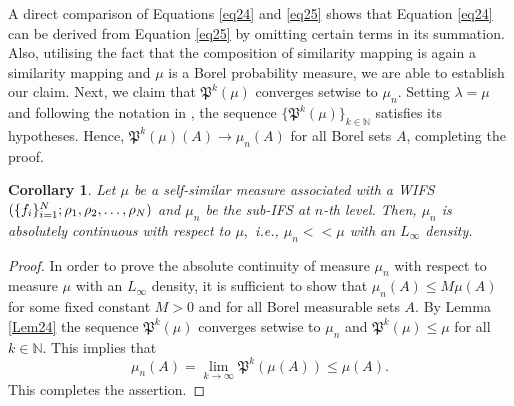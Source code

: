 \documentclass{amsproc}
\newtheorem{corollary}[theorem]{Corollary}
\theoremstyle{definition}
\theoremstyle{remark}
\numberwithin{equation}{section}
\begin{document}
  A direct comparison of Equations \ref{eq24} and \ref{eq25} shows that Equation \ref{eq24} can be derived from Equation \ref{eq25} by omitting certain terms in its summation. Also, utilising the fact that the composition of similarity mapping is again a similarity mapping and $\mu$ is a Borel probability measure, we are able to establish our claim.
  Next, we claim that $\mathfrak{P}^k(\mu)$ converges setwise to $\mu_n$. Setting $\lambda = \mu$ and following the notation in \cite[Theorem 1]{XYZL}, the sequence $\{\mathfrak{P}^k(\mu)\}_{k \in \mathbb{N}}$ satisfies its hypotheses. Hence, $\mathfrak{P}^k(\mu)(A) \to \mu_n(A)$ for all Borel sets $A$, completing the proof.
\begin{corollary}\label{cor24}
    Let $\mu$ be a self-similar measure associated with a WIFS $(\{f_i\}_{i=1}^N\\; \rho_1,\rho_2,\ldots,\rho_N)$ and $\mu_n$ be the sub-IFS at $n$-th level. Then, $\mu_n$ is absolutely continuous with respect to $\mu,$ i.e., $\mu_n << \mu$ with an $L_\infty$ density.
\end{corollary}
\begin{proof}
    In order to prove the absolute continuity of measure $\mu_n$ with respect to measure $\mu$ with an $L_\infty$ density, it is sufficient to show that $\mu_n(A) \le M \mu(A)$ for some fixed constant $M>0$ and for all Borel measurable sets $A$. By Lemma \ref{Lem24} the sequence $\mathfrak{P}^k(\mu)$ converges setwise to $\mu_n$ and $\mathfrak{P}^k(\mu) \le \mu$ for all $k \in \mathbb{N}$. This implies that 
    $$\mu_n(A)= \lim_{k \to \infty} \mathfrak{P}^k(\mu(A)) \le \mu(A).$$
    This completes the assertion.
\end{proof}
  
\end{document}
